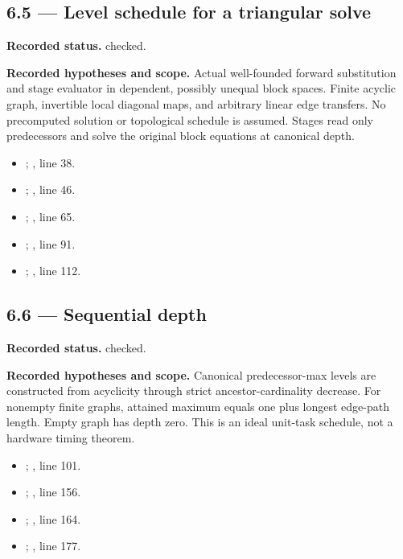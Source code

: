 \subsection{6.5 — Level schedule for a triangular solve}
\label{result:6.5}
\textbf{Recorded status.} checked.

\textbf{Recorded hypotheses and scope.} Actual well-founded forward substitution and stage evaluator in dependent, possibly unequal block spaces. Finite acyclic graph, invertible local diagonal maps, and arbitrary linear edge transfers. No precomputed solution or topological schedule is assumed. Stages read only predecessors and solve the original block equations at canonical depth.

\begin{itemize}
\item {}; , line 38.
\item {}; , line 46.
\item {}; , line 65.
\item {}; , line 91.
\item {}; , line 112.
\end{itemize}
\subsection{6.6 — Sequential depth}
\label{result:6.6}
\textbf{Recorded status.} checked.

\textbf{Recorded hypotheses and scope.} Canonical predecessor-max levels are constructed from acyclicity through strict ancestor-cardinality decrease. For nonempty finite graphs, attained maximum equals one plus longest edge-path length. Empty graph has depth zero. This is an ideal unit-task schedule, not a hardware timing theorem.

\begin{itemize}
\item {}; , line 101.
\item {}; , line 156.
\item {}; , line 164.
\item {}; , line 177.
\end{itemize}

